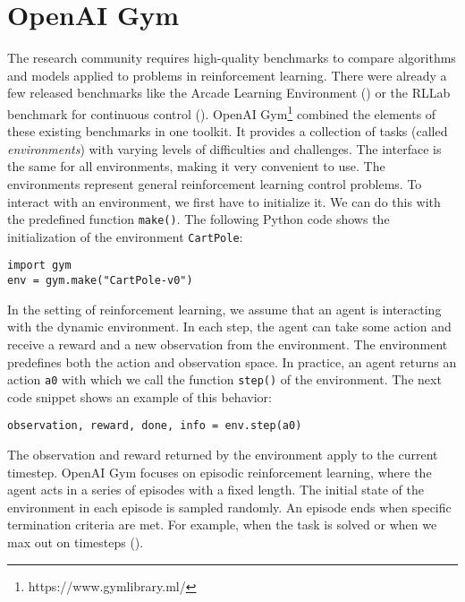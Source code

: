 \section{OpenAI Gym}
\label{sec:gym}
The research community requires high-quality benchmarks to compare algorithms and models applied to problems in reinforcement learning. There were already a few released benchmarks like the Arcade Learning Environment (\cite{bellemare2013arcade}) or the RLLab benchmark for continuous control (\cite{duan2016benchmarking}). OpenAI Gym\footnote{https://www.gymlibrary.ml/} combined the elements of these existing benchmarks in one toolkit. It provides a collection of tasks (called \textit{environments}) with varying levels of difficulties and challenges. The interface is the same for all environments, making it very convenient to use. The environments represent general reinforcement learning control problems. To interact with an environment, we first have to initialize it. We can do this with the predefined function \verb|make()|. The following Python code shows the initialization of the environment \verb|CartPole|:
\begin{verbatim}
import gym
env = gym.make("CartPole-v0")
\end{verbatim}
In the setting of reinforcement learning, we assume that an agent is interacting with the dynamic environment. In each step, the agent can take some action and receive a reward and a new observation from the environment. The environment predefines both the action and observation space. In practice, an agent returns an action \verb|a0| with which we call the function \verb|step()| of the environment. The next code snippet shows an example of this behavior:
\begin{verbatim}
observation, reward, done, info = env.step(a0)
\end{verbatim}
The observation and reward returned by the environment apply to the current timestep. OpenAI Gym focuses on episodic reinforcement learning, where the agent acts in a series of episodes with a fixed length. The initial state of the environment in each episode is sampled randomly. An episode ends when specific termination criteria are met. For example, when the task is solved or when we max out on timesteps (\cite{1606.01540}).

